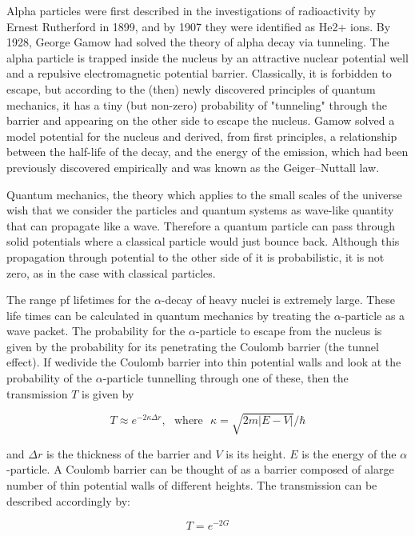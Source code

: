 \documentclass[10pt,a4paper]{article}
\newcounter{theo}
\begin{document}
Alpha particles were first described in the investigations of radioactivity by Ernest Rutherford in 1899, and by 1907 they were identified as He2+ ions. By 1928, George Gamow had solved the theory of alpha decay via tunneling. The alpha particle is trapped inside the nucleus by an attractive nuclear potential well and a repulsive electromagnetic potential barrier. Classically, it is forbidden to escape, but according to the (then) newly discovered principles of quantum mechanics, it has a tiny (but non-zero) probability of "tunneling" through the barrier and appearing on the other side to escape the nucleus. Gamow solved a model potential for the nucleus and derived, from first principles, a relationship between the half-life of the decay, and the energy of the emission, which had been previously discovered empirically and was known as the Geiger–Nuttall law.


Quantum mechanics, the theory which applies to the small scales of the universe wish that we consider the particles and quantum systems as wave-like quantity that can propagate like a wave. Therefore a quantum particle can pass through solid potentials where a classical particle would just bounce back. Although this propagation through potential to the other side of it is probabilistic, it is not zero, as in the case with classical particles.


The range pf lifetimes for the $\alpha$-decay of heavy nuclei is extremely large. These life times can be calculated in quantum mechanics by treating the $\alpha$-particle as a wave packet. The probability for the $\alpha$-particle to escape from the nucleus is given by the probability for its penetrating the Coulomb barrier (the tunnel effect). If wedivide the Coulomb barrier into thin potential walls and look at the probability of the $\alpha$-particle tunnelling through one of these, then the transmission $T$ is given by

\begin{equation}
    T \approx e^{-2\kappa \Delta r}, \ \ \ \text{where} \ \ \ \kappa = \sqrt{2m|E-V|}/\hbar
\end{equation}

and $\Delta r$ is the thickness of the barrier and $V$ is its height. $E$ is the energy of the $\alpha$-particle. A Coulomb barrier can be thought of as a barrier composed of alarge number of thin potential walls of different heights. The transmission can be
described accordingly by:

\begin{equation}
    T = e^{-2G}
\end{equation}
\end{document}
